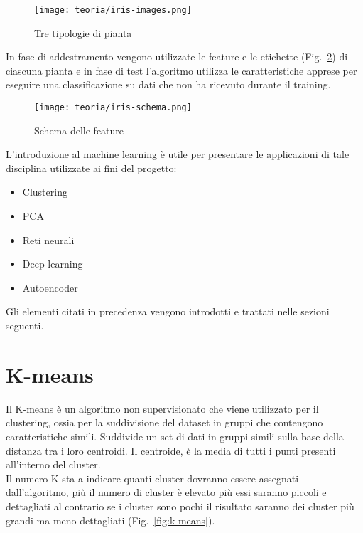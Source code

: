 \begin{figure}[!h] 
    \centering 
    \texttt{[image: teoria/iris-images.png]} 
    \caption{Tre tipologie di pianta}
    \label{fig:iris-images}
  \end{figure}
In fase di addestramento vengono utilizzate le feature e le etichette (Fig.~\ref{fig:iris-schema}) di ciascuna pianta e in fase di test l'algoritmo utilizza le caratteristiche apprese per eseguire una classificazione su dati che non ha ricevuto durante il training.

\begin{figure}[!h] 
    \centering 
    \texttt{[image: teoria/iris-schema.png]} 
    \caption{Schema delle feature}
    \label{fig:iris-schema}
  \end{figure}
L'introduzione al machine learning è utile per presentare le applicazioni di tale disciplina utilizzate ai fini del progetto:
\begin{itemize}
    \item Clustering
    \item PCA
    \item Reti neurali
    \item Deep learning
    \item Autoencoder
\end{itemize}
Gli elementi citati in precedenza vengono introdotti e trattati nelle sezioni seguenti.

\newpage

\section{K-means}
Il K-means è un algoritmo non supervisionato che viene utilizzato per il clustering, ossia per la suddivisione del dataset in gruppi che contengono caratteristiche simili.
Suddivide un set di dati in gruppi simili sulla base della distanza tra i loro centroidi. 
Il centroide, è la media di tutti i punti presenti all'interno del cluster.\\Il numero K sta a indicare quanti cluster dovranno essere assegnati dall'algoritmo, più il numero di cluster è elevato più essi saranno piccoli e dettagliati al contrario se i cluster sono pochi il risultato saranno dei cluster più grandi ma meno dettagliati (Fig.~\ref{fig:k-means}).

